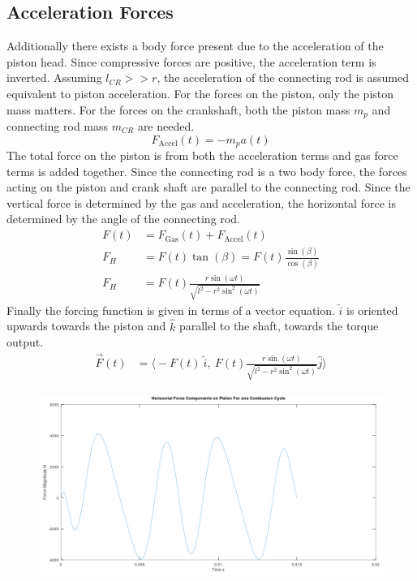 \documentclass[10pt,a4paper]{article}
\begin{document}
\subsection*{Acceleration Forces}
Additionally there exists a body force present due to the acceleration of the piston head. Since compressive forces are positive, the acceleration term is inverted. Assuming $l_{CR} >> r$, the acceleration of the connecting rod is assumed equivalent to piston acceleration. For the forces on the piston, only the piston mass matters. For the forces on the crankshaft, both the piston mass $m_p$ and connecting rod mass $m_{CR}$ are needed.
$$F_{\text{Accel}}(t) = - m_p a(t)$$
The total force on the piston is from both the acceleration terms and gas force terms is added together.
Since the connecting rod is a two body force, the forces acting on the piston and crank shaft are parallel to the connecting rod. Since the vertical force is determined by the gas and acceleration, the horizontal force is determined by the angle of the connecting rod. 
\begin{align*}
	F(t) &= F_{\text{Gas}}(t)+	F_{\text{Accel}}(t)\\
	F_H &= F(t) \tan( \beta) = F(t) \frac{\sin (\beta)}{\cos (\beta)}\\
	F_H &= F(t) \frac{r \sin (\omega t)}{\sqrt{l^2 - r^2 \sin^2(\omega t)}}
\end{align*}
Finally the forcing function is given in terms of a vector equation. $\hat{i}$ is oriented upwards towards the piston and $\hat{k}$ parallel to the shaft, towards the torque output.  
\begin{align*}
\vec{F}(t) &= \big \langle -F(t)\ \hat{i},\ F(t) \frac{r \sin(\omega t)}{\sqrt{l^2 - r^2 \sin^2(\omega t)}}  \hat{j} \big \rangle
\end{align*}
\begin{figure}[H]
		\centering
		\includegraphics[width=\textwidth]{Selection_360.png}
	\end{figure}
\end{document}

